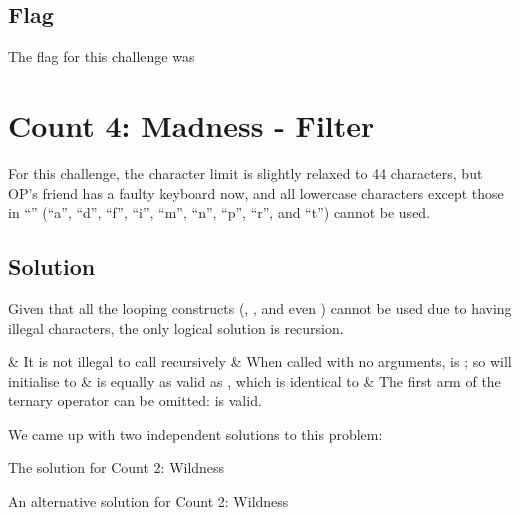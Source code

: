 	\subsection{Flag}

		The flag for this challenge was 





\pagebreak
\section{Count 4: Madness - Filter}

	For this challenge, the character limit is slightly relaxed to \num{44} characters, but OP's friend has a faulty keyboard now,
	and all lowercase characters except those in \enquote{} (\enquote{a}, \enquote{d}, \enquote{f}, \enquote{i}, \enquote{m},
	\enquote{n}, \enquote{p}, \enquote{r}, and \enquote{t}) cannot be used.

	\subsection{Solution}

		Given that all the looping constructs (, , and even ) cannot be used due to having illegal characters,
		the only logical solution is recursion.

		\begin{bulletlist}
			& It is not illegal to call  recursively
			& When called with no arguments,  is ; so  will initialise  to 
			&  is equally as valid as , which is identical to 
			& The first arm of the ternary operator can be omitted:  is valid.
		\end{bulletlist}

		We came up with two independent solutions to this problem:

		\begin{listing}[!htbp]
			\caption{The solution for Count 2: Wildness}
		\end{listing}

		\begin{listing}[!htbp]
			\caption{An alternative solution for Count 2: Wildness}
		\end{listing}


